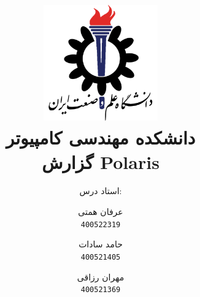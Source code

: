 \title{
    \center
    \includegraphics[width=5cm, height=5cm]{images/IUST_logo_color.png} \\
    دانشکده مهندسی کامپیوتر \\[25pt]     
گزارش Polaris\\
\CourseName
}

\author{
    استاد درس:
    \Instructor \\[25pt]
}

\author{
  عرفان همتی\\
  \texttt{400522319}
  \and
  حامد سادات\\
  \texttt{400521405}
  \and
  مهران رزاقی\\
  \texttt{400521369}
}
\date{\Semester}